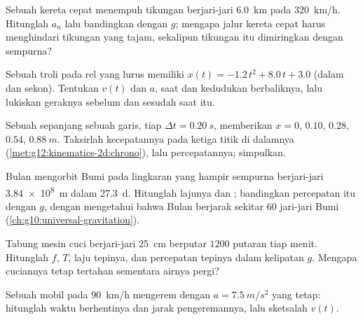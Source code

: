 \begin{exercise}[$\star\star$]\label{exo:g12:kinematics-2d:6}
Sebuah kereta cepat menempuh tikungan berjari-jari \qty{6.0}{km} pada
\qty{320}{km/h}. Hitunglah $a_n$ lalu bandingkan dengan $g$; mengapa
jalur kereta cepat harus menghindari tikungan yang tajam, sekalipun
tikungan itu dimiringkan dengan sempurna?
\end{exercise}

\begin{exercise}[$\star\star$]\label{exo:g12:kinematics-2d:7}
Sebuah troli pada rel yang lurus memiliki
$x(t) = -1.2\,t^2 + 8.0\,t + 3.0$ (dalam  dan sekon). Tentukan
$v(t)$ dan $a$, saat dan kedudukan berbaliknya, lalu lukiskan geraknya
sebelum dan sesudah saat itu.
\end{exercise}

\begin{exercise}[$\star\star$]\label{exo:g12:kinematics-2d:8}
Sebuah  sepanjang sebuah garis, tiap
$\Delta t = \qty{0.20}{s}$, memberikan $x = 0$, $0.10$, $0.28$,
$0.54$, $\qty{0.88}{m}$. Taksirlah kecepatannya pada ketiga titik di
dalamnya (\cref{met:g12:kinematics-2d:chrono}), lalu percepatannya;
simpulkan.
\end{exercise}

\begin{exercise}[$\star\star$]\label{exo:g12:kinematics-2d:9}
Bulan mengorbit Bumi pada lingkaran yang hampir sempurna berjari-jari
\qty{3.84e8}{m} dalam \qty{27.3}{d}. Hitunglah lajunya dan ; bandingkan percepatan itu dengan $g$, dengan mengetahui
bahwa Bulan berjarak sekitar $60$ jari-jari Bumi
(\cref{ch:g10:universal-gravitation}).
\end{exercise}

\begin{exercise}[$\star\star$]\label{exo:g12:kinematics-2d:10}
Tabung mesin cuci berjari-jari \qty{25}{cm} berputar $1200$ putaran tiap
menit. Hitunglah $f$, $T$, laju tepinya, dan percepatan tepinya dalam
kelipatan $g$. Mengapa cuciannya tetap tertahan sementara airnya pergi?
\end{exercise}

\begin{exercise}[$\star\star$]\label{exo:g12:kinematics-2d:11}
Sebuah mobil pada \qty{90}{km/h} mengerem dengan $a = \qty{7.5}{m/s^2}$
yang tetap: hitunglah waktu berhentinya dan jarak pengeremannya, lalu
sketsalah $v(t)$.
\end{exercise}

